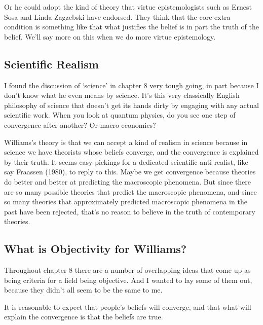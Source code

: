 \documentclass[
]{article}
\providecommand{\tightlist}{%
  \setlength{\itemsep}{0pt}\setlength{\parskip}{0pt}}
\begin{document}
Or he could adopt the kind of theory that virtue epistemologists such as
Ernest Sosa and Linda Zagzebski have endorsed. They think that the core
extra condition is something like that what justifies the belief is in
part the truth of the belief. We'll say more on this when we do more
virtue epistemology.

\hypertarget{scientific-realism}{%
\subsection{Scientific Realism}\label{scientific-realism}}

I found the discussion of `science' in chapter 8 very tough going, in
part because I don't know what he even means by science. It's this very
classically English philosophy of science that doesn't get its hands
dirty by engaging with any actual scientific work. When you look at
quantum physics, do you see one step of convergence after another? Or
macro-economics?

Williams's theory is that we can accept a kind of realism in science
because in science we have theorists whose beliefs converge, and the
convergence is explained by their truth. It seems easy pickings for a
dedicated scientific anti-realist, like say Fraassen (1980), to reply to
this. Maybe we get convergence because theories do better and better at
predicting the macroscopic phenomena. But since there are so many
possible theories that predict the macroscopic phenomena, and since so
many theories that approximately predicted macroscopic phenomena in the
past have been rejected, that's no reason to believe in the truth of
contemporary theories.

\hypertarget{what-is-objectivity-for-williams}{%
\subsection{What is Objectivity for
Williams?}\label{what-is-objectivity-for-williams}}

Throughout chapter 8 there are a number of overlapping ideas that come
up as being criteria for a field being objective. And I wanted to lay
some of them out, because they didn't all seem to be the same to me.

\begin{description}
\tightlist
\item[Convergence on Reality]
It is reasonable to expect that people's beliefs will converge, and that
what will explain the convergence is that the beliefs are true.
\end{description}
\end{document}
